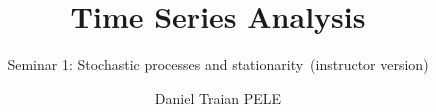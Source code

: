 \title[Time Series Analysis]{Time Series Analysis}
\subtitle{Seminar 1: Stochastic processes and stationarity\ifsolutions\ (instructor version)\fi}
\author[D.T. Pele]{Daniel Traian PELE}
\date{}

\providecommand{\tsaapplink}[3]{\hypertarget{#2}{}\hyperlink{#1}{\beamergotobutton{#3}}}  %
\providecommand{\tsaappback}[2]{\begin{tikzpicture}[remember picture,overlay]\node[anchor=south east] at ([xshift=-3mm,yshift=7mm]current page.south east){\hyperlink{#1}{\beamerreturnbutton{#2}}};\end{tikzpicture}}  %
\providecommand{\tsachlink}[2]{\href{#1}{#2}}  %
\providecommand{\tsachlinkt}[2]{\href{#1}{\usebeamercolor[fg]{frametitle}#2}}  %



